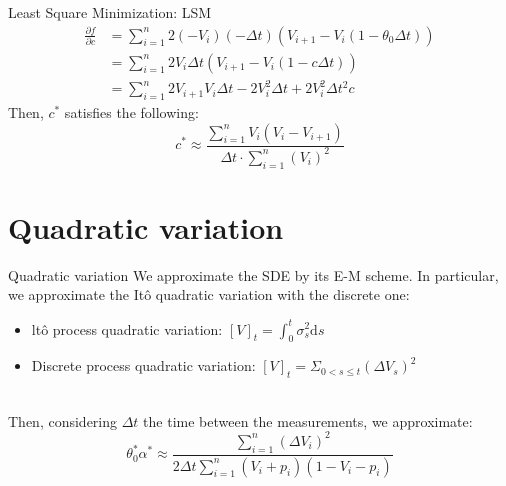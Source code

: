 \documentclass{beamer}
\begin{document}
\begin{frame}{Least Square Minimization: LSM}
\justifying
$$
\begin{aligned}
\frac{\partial f}{\partial c} &=\sum_{i=1}^{n} 2\left(-V_{i}\right)(-\Delta t)\left(V_{i+1}-V_{i}\left(1-\theta_{0} \Delta t\right)\right) \\
&=\sum_{i=1}^{n} 2 V_{i} \Delta t\left(V_{i+1}-V_{i}(1-c \Delta t)\right) \\
&=\sum_{i=1}^{n} 2 V_{i+1} V_{i} \Delta t-2 V_{i}^{2} \Delta t+2 V_{i}^{2} \Delta t^{2} c
\end{aligned}
$$
Then, $c^{* }$ satisfies the following: 
$$
c^{ *} \approx \frac{\sum_{i=1}^{n} V_{i}\left(V_{i}-V_{i+1}\right)}{\Delta t \cdot \sum_{i=1}^{n}\left(V_{i}\right)^{2}}
$$
\end{frame}

\section{Quadratic variation}
\begin{frame}{Quadratic variation}
\justifying
We approximate the SDE by its E-M scheme. In particular, we approximate the Itô quadratic variation with the discrete one:
\begin{itemize}
\item ltô process quadratic variation: $[V]_{t}=\int_{0}^{t} \sigma_{s}^{2} \mathrm{d} s$
\item Discrete process quadratic variation: $[V]_{t}=\Sigma_{0<s \leq t}\left(\Delta V_{s}\right)^{2}$
\end{itemize}$$$$\\
Then, considering $\Delta t$ the time between the measurements, we approximate:
$$
\theta_{0}^{*} \alpha^{*} \approx \frac{\sum_{i=1}^{n}\left(\Delta V_{i}\right)^{2}}{2 \Delta t \sum_{i=1}^{n}\left(V_{i}+p_{i}\right)\left(1-V_{i}-p_{i}\right)}
$$
\end{frame}
\end{document}
